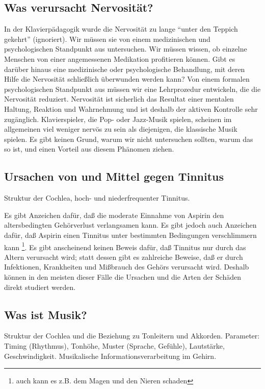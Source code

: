 \subsection{Was verursacht Nervosität?}\hypertarget{c1iv6d}{}

In der Klavierpädagogik wurde die Nervosität zu lange \enquote{unter den Teppich gekehrt} (ignoriert).
Wir müssen sie von einem medizinischen und psychologischen Standpunkt aus untersuchen.
Wir müssen wissen, ob einzelne Menschen von einer angemessenen Medikation profitieren können.
Gibt es darüber hinaus eine medizinische oder psychologische Behandlung, mit deren Hilfe die Nervosität schließlich überwunden werden kann?
Von einem formalen psychologischen Standpunkt aus müssen wir eine Lehrprozedur entwickeln, die die Nervosität reduziert.
Nervosität ist sicherlich das Resultat einer mentalen Haltung, Reaktion und Wahrnehmung und ist deshalb der aktiven Kontrolle sehr zugänglich.
Klavierspieler, die Pop- oder Jazz-Musik spielen, scheinen im allgemeinen viel weniger nervös zu sein als diejenigen, die klassische Musik spielen.
Es gibt keinen Grund, warum wir nicht untersuchen sollten, warum das so ist, und einen Vorteil aus diesem Phänomen ziehen.


\subsection{Ursachen von und Mittel gegen Tinnitus}\hypertarget{c1iv6e}{}

Struktur der Cochlea, hoch- und niederfrequenter Tinnitus.

Es gibt Anzeichen dafür, daß die moderate Einnahme von Aspirin den altersbedingten Gehörverlust verlangsamen kann.
Es gibt jedoch auch Anzeichen dafür, daß Aspirin einen Tinnitus unter bestimmten Bedingungen verschlimmern kann \footnote{auch kann es z.B. dem Magen und den Nieren schaden}.
Es gibt anscheinend keinen Beweis dafür, daß Tinnitus nur durch das Altern verursacht wird; statt dessen gibt es zahlreiche Beweise, daß er durch Infektionen, Krankheiten und Mißbrauch des Gehörs verursacht wird.
Deshalb können in den meisten dieser Fälle die Ursachen und die Arten der Schäden direkt studiert werden.


\subsection{Was ist Musik?}\hypertarget{c1iv6f}{}

Struktur der Cochlea und die Beziehung zu Tonleitern und Akkorden.
Parameter: Timing (Rhythmus), Tonhöhe, Muster (Sprache, Gefühle), Lautstärke, Geschwindigkeit.
Musikalische Informationsverarbeitung im Gehirn.


